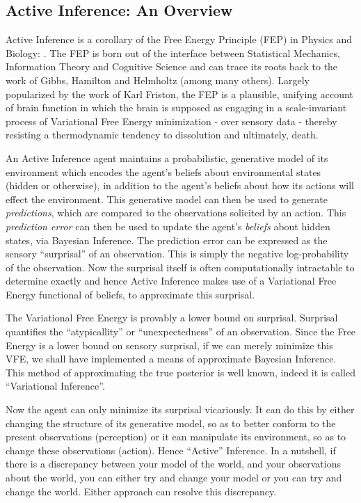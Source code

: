 \documentclass[12pt, oneside]{article}
\begin{document}
\subsection{Active Inference: An Overview}
Active Inference is a corollary of the Free Energy Principle (FEP) in Physics and Biology: \textcite{FEP-Rough-Guide-Brain}. The FEP is born out of the interface between Statistical Mechanics, Information Theory and Cognitive Science and can trace its roots back to the work of Gibbs, Hamilton and Helmholtz (among many others). Largely popularized by the work of Karl Friston, the FEP is a plausible, unifying account of brain function in which the brain is supposed as engaging in a scale-invariant process of Variational Free Energy minimization - over sensory data - thereby resisting a thermodynamic tendency to dissolution and ultimately, death.

An Active Inference agent maintains a probabilistic, generative model of its environment which encodes the agent's beliefs about environmental states (hidden or otherwise), in addition to the agent's beliefs about how its actions will effect the environment. This generative model can then be used to generate \textit{predictions}, which are compared to the observations solicited by an action. This \textit{prediction error} can then be used to update the agent's \textit{beliefs} about hidden states, via Bayesian Inference. The prediction error can be expressed as the sensory ``surprisal'' of an observation. This is simply the negative log-probability of the observation. Now the surprisal itself is often computationally intractable to determine exactly and hence Active Inference makes use of a Variational Free Energy functional of beliefs, to approximate this surprisal.  

The Variational Free Energy is provably a lower bound on surprisal. Surprisal quantifies the ``atypicallity'' or ``unexpectedness'' of an observation. Since the Free Energy is a lower bound on sensory surprisal, if we can merely minimize this VFE, we shall have implemented a means of approximate Bayesian Inference. This method of approximating the true posterior is well known, indeed it is called ``Variational Inference''. 

Now the agent can only minimize its surprisal vicariously. It can do this by either changing the structure of its generative model, so as to better conform to the present observations (perception) or it can manipulate its environment, so as to change these observations (action). Hence ``Active'' Inference. In a nutshell, if there is a discrepancy between your model of the world, and your observations about the world, you can either try and change your model or you can try and change the world. Either approach can resolve this discrepancy.  
\end{document}
